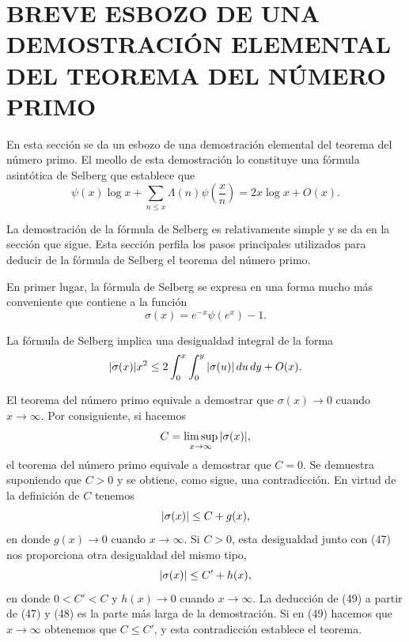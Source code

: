\documentclass[12pt,a4paper]{book}
\begin{document}
    \section{BREVE ESBOZO DE UNA DEMOSTRACIÓN ELEMENTAL DEL TEOREMA DEL NÚMERO PRIMO}

    En esta sección se da un esbozo de una demostración elemental del teorema del
    número primo. El meollo de esta demostración lo constituye una fórmula asintótica
    de Selberg que establece que
    \begin{equation*}
        \psi(x)\log x+\sum_{n\leq x}\Lambda(n)\psi\left(\frac{x}{n}\right)=2x\log x+O(x).
    \end{equation*}

    La demostración de la fórmula de Selberg es relativamente simple y se da en la
    sección que sigue. Esta sección perfila los pasos principales utilizados para
    deducir de la fórmula de Selberg el teorema del número primo.

    En primer lugar, la fórmula de Selberg se expresa en una forma mucho más
    conveniente que contiene a la función
    \begin{equation*}
        \sigma(x)=e^{-x}\psi(e^x)-1.
    \end{equation*}
    \begin{teorema}
        La fórmula de Selberg implica una desigualdad integral de la forma
        \begin{equation}
            \abs{\sigma(x)}x^2\leq2\int_0^x\int_0^y\abs{\sigma(u)}\,du\,dy+O(x).
        \end{equation}
    \end{teorema}

    El teorema del número primo equivale a demostrar que $\sigma(x)\to0$ cuando
    $x\to\infty$. Por consiguiente, si hacemos
    \begin{equation*}
        C=\limsup_{x\to\infty}\abs{\sigma(x)},
    \end{equation*}
    el teorema del número primo equivale a demostrar que $C=0$. Se demuestra
    suponiendo que $C>0$ y se obtiene, como sigue, una contradicción. En virtud de la
    definición de $C$ tenemos
    \begin{equation}
        \abs{\sigma(x)}\leq C+g(x),
    \end{equation}
    en donde $g(x)\to0$ cuando $x\to\infty$. Si $C>0$, esta desigualdad junto con
    (47) nos proporciona otra desigualdad del mismo tipo,
    \begin{equation}
        \abs{\sigma(x)}\leq C'+h(x),
    \end{equation}
    en donde $0<C'<C$ y $h(x)\to0$ cuando $x\to\infty$. La deducción de (49) a partir
    de (47) y (48) es la parte más larga de la demostración. Si en (49) hacemos que
    $x\to\infty$ obtenemos que $C\leq C'$, y esta contradicción establece el teorema.
\end{document}

